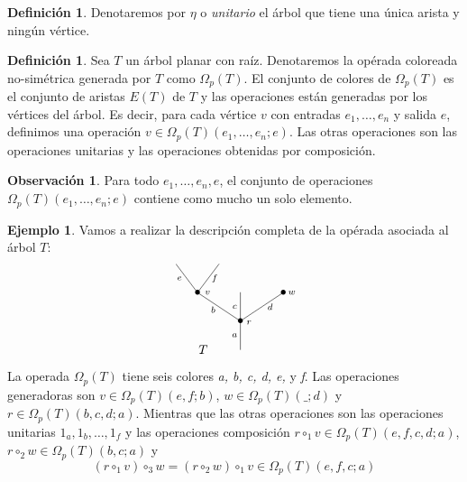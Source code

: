 \documentclass[11pt,a4paper,openright,oneside]{article}
\numberwithin{equation}{section}
\theoremstyle{definition}
\newtheorem{defi}[teo]{Definici\'on}
\newtheorem{ex}[teo]{Ejemplo}
\newtheorem{obs}[teo]{Observaci\'on}
\begin{document}
\begin{defi}
    Denotaremos por $\eta$ o \emph{unitario} el \'arbol que tiene una \'unica arista y ning\'un v\'ertice.
\end{defi}
\begin{defi}
    Sea $T$ un \'arbol planar con ra\'iz. Denotaremos la op\'erada coloreada no-sim\'etrica generada por $T$ como $\Omega_p(T)$. El conjunto de colores de $\Omega_p(T)$ es el conjunto de aristas $E(T)$ de $T$ y las operaciones est\'an generadas por los v\'ertices del \'arbol.
    Es decir, para cada v\'ertice $v$ con entradas $e_1,\dots,e_n$ y salida $e$, definimos una operaci\'on $v\in \Omega_p(T)(e_1,\dots,e_n;e)$. Las otras operaciones son las operaciones unitarias y las operaciones obtenidas por composici\'on.
\end{defi}
\begin{obs}
    Para todo $e_1,\dots,e_n,e$, el conjunto de operaciones $\Omega_p(T)(e_1,\dots,e_n;e)$ contiene como mucho un solo elemento.
\end{obs}
\begin{ex}
    Vamos a realizar la descripci\'on completa de la op\'erada asociada al \'arbol $T$:
    \begin{equation}
        \xy
        <0.08cm, 0cm>:
        (0.0, 0.0)*{}="1"; %
        (0.0, 10.0)*=0{\bullet}="2"; %
        (-15.0, 20.0)*=0{\bullet}="3"; %
        (-22.5, 30.0)*{}="4"; %
        (-7.5, 30.0)*{}="5"; %
        (0.0, 20.0)*{}="6"; %
        (15.0, 20.0)*=0{\bullet}="7"; %
        "1";"2" **\dir{-};
        "2";"3" **\dir{-};
        "3";"4" **\dir{-};
        "3";"5" **\dir{-};
        "2";"6" **\dir{-};
        "2";"7" **\dir{-};
        (3.0, 9.5)*=0{\scriptstyle r};
        (-11.5, 20.0)*=0{\scriptstyle v};
        (-2.0, 5.0)*=0{\scriptstyle a};
        (-9.5, 14.0)*=0{\scriptstyle b};
        (-21.3, 25.0)*=0{\scriptstyle e};
        (-9, 25.0)*=0{\scriptstyle f};
        (-2.0, 15.0)*=0{\scriptstyle c};
        (10.4, 15.0)*=0{\scriptstyle d};
        (18.0, 20.0)*=0{\scriptstyle w};
        (-13,0)*{T};
        \endxy
    \end{equation}

    La operada $\Omega_p(T)$ tiene seis colores \textit{a, b, c, d, e,} y \textit{f}. Las operaciones generadoras son $v\in \Omega_p(T)(e,f;b)$, $w\in \Omega_p(T)(\_;d)$ y $r\in \Omega_p(T)(b,c,d;a)$.
    Mientras que las otras operaciones son las operaciones unitarias $1_a,1_b,\dots,1_f$ y las operaciones composici\'on $r\circ_1v\in \Omega_p(T)(e,f,c,d;a)$, $r\circ_2w\in \Omega_p(T)(b,c;a)$ y
    $$(r\circ_1 v)\circ_3 w = (r\circ_2 w)\circ_1 v  \in \Omega_p(T)(e,f,c;a)$$
\end{ex}
\end{document}
